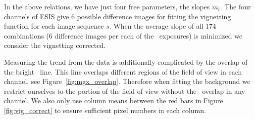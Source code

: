 
In the above relations, we have just four free parameters, the slopes $m_i$. 
The four channels of ESIS give 6 possible difference images for fitting the vignetting function for each image sequence $s$. 
When the average slope of all 174 combinations (6 difference images per each of the \numDataFrames \ exposures) is minimized we consider the vignetting corrected.

Measuring the trend from the data is additionally complicated by the overlap of the bright \mgxbright \ line.  
This line overlaps different regions of the field of view in each channel, see Figure~\ref{fig:mgx_overlap}.  
Therefore when fitting the background we restrict ourselves to the portion of the field of view without the \mgxbright \ overlap in any channel.
We also only use column means between the red bars in Figure \ref{fig:vig_correct} to ensure sufficient pixel numbers in each column.  

